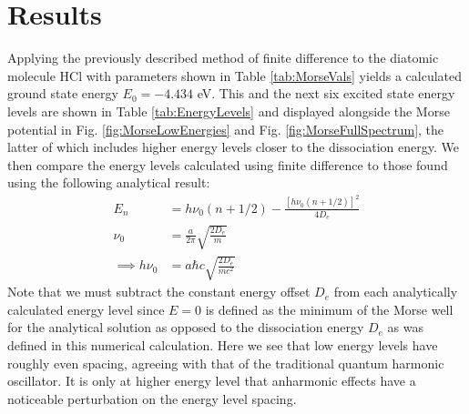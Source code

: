 \documentclass[%
aps, %
prl, %
preprint, %
12pt, %
amsfonts, %
amssymb, %
amsmath, %
endfloats,%
raggedbottom, %
]{revtex4-1}
\begin{document}
\section{\label{sec:Results}Results}
Applying the previously described method of finite difference to the diatomic molecule HCl with
parameters shown in Table \ref{tab:MorseVals} yields a calculated ground state energy
$E_0 = -4.434$ eV. This and the next six excited state energy levels are shown in Table
\ref{tab:EnergyLevels} and displayed alongside the Morse potential in Fig.
\ref{fig:MorseLowEnergies} and Fig. \ref{fig:MorseFullSpectrum}, the latter of which includes higher
energy levels closer to the dissociation energy. We then compare the energy levels calculated using finite
difference to those found using the following analytical result:
\begin{align}
    E_n &= h\nu_0(n+1/2) - \frac{[h\nu_0(n+1/2)]^2}{4D_e} \\
    \nu_0 &= \frac{a}{2\pi}\sqrt{\frac{2D_e}{m}} \\
    \implies h\nu_0 &= a\hbar c \sqrt{\frac{2D_e}{mc^2}}
\end{align}
Note that we must subtract the constant energy offset $D_e$ from each analytically calculated
energy level since $E = 0$ is defined as the minimum of the Morse well for the analytical
solution as opposed to the dissociation energy $D_e$ as was defined in this numerical calculation. Here we see
that low energy levels have roughly even spacing, agreeing with that of the traditional quantum harmonic
oscillator. It is only at higher energy level that anharmonic effects have a noticeable perturbation on
the energy level spacing.

\begin{table}
\centering
\caption{\label{tab:EnergyLevels}First seven energy levels for the diatomic molecule HCl calculated
using finite difference and analytical methods.}
\noindent{}
\end{table}
\end{document}
